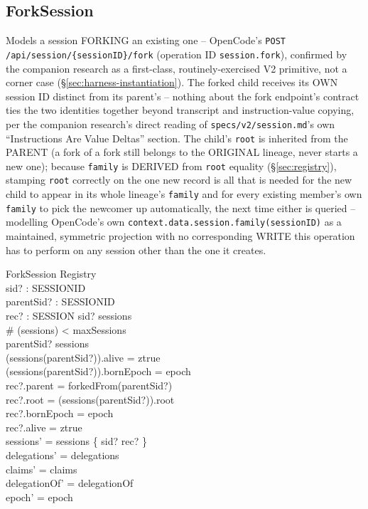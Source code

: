 \documentclass[a4paper,10pt,fleqn]{article}
\newcommand{\fpath}[1]{\texttt{#1}}
\newcommand{\field}[1]{\texttt{#1}}
\begin{document}
\subsection{ForkSession}
\label{sec:opforksession}

Models a session FORKING an existing one -- OpenCode's
\field{POST /api/session/\{sessionID\}/fork} (operation ID
\field{session.fork}), confirmed by the companion research as a
first-class, routinely-exercised V2 primitive, not a corner case
(\S\ref{sec:harness-instantiation}). The forked child receives its OWN
session ID distinct from its parent's -- nothing about the fork
endpoint's contract ties the two identities together beyond transcript
and instruction-value copying, per the companion research's direct
reading of \fpath{specs/v2/session.md}'s own ``Instructions Are Value
Deltas'' section. The child's \field{root} is inherited from the PARENT
(a fork of a fork still belongs to the ORIGINAL lineage, never starts a
new one); because \field{family} is DERIVED from \field{root} equality
(\S\ref{sec:registry}), stamping \field{root} correctly on the one new
record is all that is needed for the new child to appear in its whole
lineage's \field{family} and for every existing member's own
\field{family} to pick the newcomer up automatically, the next time
either is queried -- modelling OpenCode's own
\field{context.data.session.family(sessionID)} as a maintained,
symmetric projection with no corresponding WRITE this operation has to
perform on any session other than the one it creates.

\begin{schema}{ForkSession}
\Delta Registry \\
sid? : SESSIONID \\
parentSid? : SESSIONID \\
rec? : SESSION
\where
sid? \notin \dom sessions \\
\# (\dom sessions) < maxSessions \\
parentSid? \in \dom sessions \\
(sessions(parentSid?)).alive = ztrue \\
(sessions(parentSid?)).bornEpoch = epoch \\
rec?.parent = forkedFrom(parentSid?) \\
rec?.root = (sessions(parentSid?)).root \\
rec?.bornEpoch = epoch \\
rec?.alive = ztrue \\
sessions' = sessions \oplus \{ sid? \mapsto rec? \} \\
delegations' = delegations \\
claims' = claims \\
delegationOf' = delegationOf \\
epoch' = epoch
\end{schema}
\end{document}

